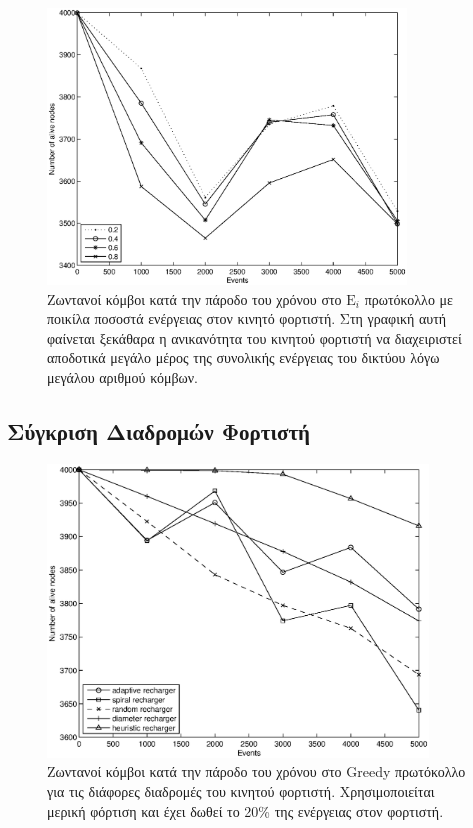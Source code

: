 \begin{figure}[H]
  \centering
   \includegraphics[width=0.85\textwidth]{experiments/4000nodes/3.smallVSbigpercentage/alive_nodes_ei_rc_per_our.eps}
  \caption{Ζωντανοί κόμβοι κατά την πάροδο του χρόνου στο $\text{E}_{i}$ πρωτόκολλο με ποικίλα ποσοστά ενέργειας στον κινητό φορτιστή. Στη γραφική αυτή φαίνεται
ξεκάθαρα η ανικανότητα του κινητού φορτιστή να διαχειριστεί αποδοτικά μεγάλο μέρος της συνολικής ενέργειας του δικτύου λόγω μεγάλου αριθμού κόμβων.}
  \label{fig:5_3exp_1_3}
\end{figure}

\subsection{Σύγκριση Διαδρομών Φορτιστή}\label{subc:result6_4}
\begin{figure}[H]
  \centering
  \includegraphics[width=0.9\textwidth]{experiments/4000nodes/4.ourVSnaive/alive_nodes_greedy_rc_per_our-spiral-random-diameter-heuristic.eps}
  \caption{Ζωντανοί κόμβοι κατά την πάροδο του χρόνου στο Greedy πρωτόκολλο για τις διάφορες διαδρομές του κινητού φορτιστή. Χρησιμοποιείται μερική φόρτιση και έχει
δωθεί το 20\% της ενέργειας στον φορτιστή.}
  \label{fig:5_4exp_1_1}
\end{figure}

